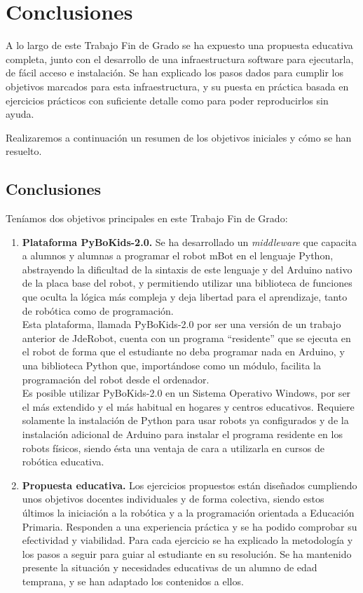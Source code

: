 \chapter{Conclusiones}\label{cap:conclusiones}
A lo largo de este Trabajo Fin de Grado se ha expuesto una propuesta educativa completa, junto con el desarrollo de una infraestructura software para ejecutarla, de fácil acceso e instalación. Se han explicado los pasos dados para cumplir los objetivos marcados para esta infraestructura, y su puesta en práctica basada en ejercicios prácticos con suficiente detalle como para poder reproducirlos sin ayuda.
\par Realizaremos a continuación un resumen de los objetivos iniciales y cómo se han resuelto.
\section{Conclusiones}
Teníamos dos objetivos principales en este Trabajo Fin de Grado:
\begin{enumerate}
	\item \textbf{Plataforma PyBoKids-2.0.} Se ha desarrollado un \textit{middleware} que capacita a alumnos y alumnas a programar el robot mBot en el lenguaje Python, abstrayendo la dificultad de la sintaxis de este lenguaje y del Arduino nativo de la placa base del robot, y permitiendo utilizar una biblioteca de funciones que oculta la lógica más compleja y deja libertad para el aprendizaje, tanto de robótica como de programación. \\
	Esta plataforma, llamada PyBoKids-2.0 por ser una versión de un trabajo anterior de JdeRobot\cite{JdeRobot}, cuenta con un programa ``residente'' que se ejecuta en el robot de forma que el estudiante no deba programar nada en Arduino, y una biblioteca Python que, importándose como un módulo, facilita la programación del robot desde el ordenador.\\
	Es posible utilizar PyBoKids-2.0 en un Sistema Operativo Windows, por ser el más extendido y el más habitual en hogares y centros educativos. Requiere solamente la instalación de Python para usar robots ya configurados y de la instalación adicional de Arduino para instalar el programa residente en los robots físicos, siendo ésta una ventaja de cara a utilizarla en cursos de robótica educativa. 
	
	\item \textbf{Propuesta educativa.} Los ejercicios propuestos están diseñados cumpliendo unos objetivos docentes individuales y de forma colectiva, siendo estos últimos la iniciación a la robótica y a la programación orientada a Educación Primaria. Responden a una experiencia práctica y se ha podido comprobar su efectividad y viabilidad. Para cada ejercicio se ha explicado la metodología y los pasos a seguir para guiar al estudiante en su resolución. Se ha mantenido presente la situación y necesidades educativas de un alumno de edad temprana, y se han adaptado los contenidos a ellos.  
\end{enumerate}
